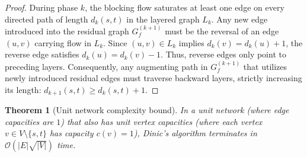 \documentclass[11pt, letterpaper]{article}
\newtheorem{theorem}{Theorem}[section]
\begin{document}
\begin{proof}
During phase $k$, the blocking flow saturates at least one edge on every directed path of length $d_k(s, t)$ in the layered graph $L_k$. Any new edge introduced into the residual graph $G_f^{(k+1)}$ must be the reversal of an edge $(u, v)$ carrying flow in $L_k$. Since $(u, v) \in L_k$ implies $d_k(v) = d_k(u) + 1$, the reverse edge satisfies $d_k(u) = d_k(v) - 1$. 
Thus, reverse edges only point to preceding layers. Consequently, any augmenting path in $G_f^{(k+1)}$ that utilizes newly introduced residual edges must traverse backward layers, strictly increasing its length: $d_{k+1}(s, t) \ge d_k(s, t) + 1$.
\end{proof}

\begin{theorem}[Unit network complexity bound]
In a unit network (where edge capacities are $1$) that also has unit vertex capacities (where each vertex $v \in V \setminus \{s, t\}$ has capacity $c(v) = 1$), Dinic's algorithm terminates in $\mathcal{O}(|E|\sqrt{|V|})$ time.
\end{theorem}
\end{document}
